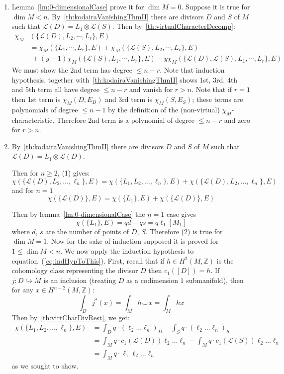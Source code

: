 \documentclass{book}
\newenvironment{Proof}[1][]
  {\begin{ProofTcb}[#1]}
  {\end{ProofTcb}}
\newcommand{\Z}{{\mathbb{Z}}}
\newcommand{\CL}{{\mathcal{L}}}
\begin{document}
\begin{Proof}
\begin{enumerate}
  \item[1/2. ] Lemma~\cref{lm:0-dimensionalCase} prove it for $\dim M=0$. Suppose it is true for $\dim M<n$.
    By~\cref{th:kodairaVanishingThmII} there are divisors $D$ and $S$ of $M$ such that
    $\CL(D)=L_1\otimes\CL(S)$. Then by~\cref{th:virtualCharacterDecomp}:
    \begin{align*}
      \chi_M&(\{ \CL(D),L_2,\cdots,L_r \},E)\\
    &= \chi_M(\{ L_1,\cdots,L_r \},E) + \chi_M(\{ \CL(S),L_2,\cdots,L_r \},E) \\
                          &\ + (y-1)\chi_M(\{\CL(S),L_1,\cdots,L_r\},E)
                          - y\chi_M(\{\CL(D),\CL(S),L_1,\cdots,L_r\},E)
  \end{align*}
We must show the 2nd term has degree $\leq n-r$. Note that
induction hypothesis, together with~\cref{th:kodairaVanishingThmII} shows 1st, 3rd, 4th and 5th term all have
degree $\leq n-r$ and vanish for $r>n$. Note that if $r=1$ then 1st term is $\chi_M(D,E_D)$ and 3rd term is
$\chi_M(S,E_S)$; these terms are polynomials of degree $\leq n-1$ by the definition of the (non-virtual)
$\chi_M$-characteristic. Therefore 2nd term is a polynomial of degree $\leq n-r$ and zero for $r>n$.
\item[3. ] By~\cref{th:kodairaVanishingThmII} there are divisors $D$ and $S$ of $M$ such that
  $\CL(D)=L_1\otimes\CL(D)$.

Then for $n\ge 2$, (1) gives:
\[
    \chi(\{ \CL(D),L_2,\ldots,\ell_n \},E) = \chi(\{ L_1,L_2,\ldots,\ell_n \},E) + \chi(\{
    \CL(D),L_2,\ldots,\ell_n \},E)
\]
and for $n=1$
\begin{equation}\label{eq:indHypToThis}
    \chi(\{ \CL(D) \},E) = \chi(\{ L_1 \},E) + \chi(\{ \CL(D) \},E)
\end{equation}

Then by lemma~\cref{lm:0-dimensionalCase} the $n=1$ case gives
\[
    \chi(\{ L_1 \},E) = qd - qs = q\ell_1[M_1]
\]
where $d$, $s$ are the number of points of $D$, $S$. Therefore (2) is true for $\dim M=1$. Now for the sake of
induction supposed it is proved for $1\leq\dim M<n$. We now apply the induction hypothesis to
equation~(\ref{eq:indHypToThis}). First, recall that if $h \in H^2(M, \Z)$ is the cohomology class
representing the divisor $D$ then $c_1([D]) = h$. If $j: D \hookrightarrow M$ is an inclusion (treating $D$ as
a codimension $1$ submanifold), then for any $x \in H^{n-2}(M, \Z)$:
\[
  \int_D j^*(x) = \int_M h\smile x = \int_M hx
\]
Then by~\cref{th:virtCharDivRest}, we get:
\begin{align*}
    \chi(\{ L_1,L_2,\ldots,\ell_n \},E) &= \int_D q\cdot(\ell_2\ldots \ell_n)_D - \int_S q\cdot(\ell_2\ldots \ell_n)_S \\
    &= \int_M q\cdot c_1(\CL(D))\ell_2\ldots \ell_n - \int_Mq\cdot c_1(\CL(S))\ell_2\ldots \ell_n \\
    &= \int_M q\cdot \ell_1\ell_2\ldots \ell_n
\end{align*}
as we sought to show.
\end{enumerate}
\end{Proof}
\end{document}
